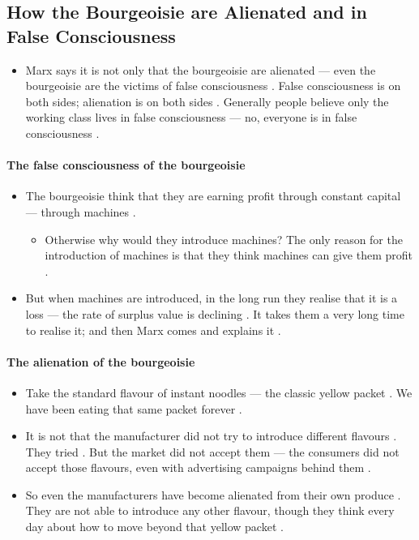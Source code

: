 \subsection{How the Bourgeoisie are Alienated and in False Consciousness}
\begin{itemize}
    \item Marx says it is not only that the bourgeoisie are alienated --- even the bourgeoisie are the victims of false consciousness . False consciousness is on both sides; alienation is on both sides . Generally people believe only the working class lives in false consciousness --- no, everyone is in false consciousness .
\end{itemize}

\paragraph{The false consciousness of the bourgeoisie}
\begin{itemize}
    \item The bourgeoisie think that they are earning profit through constant capital --- through machines .
    \begin{itemize}
        \item Otherwise why would they introduce machines? The only reason for the introduction of machines is that they think machines can give them profit .
    \end{itemize}
    \item But when machines are introduced, in the long run they realise that it is a loss --- the rate of surplus value is declining . It takes them a very long time to realise it; and then Marx comes and explains it .
\end{itemize}

\paragraph{The alienation of the bourgeoisie}
\begin{ExampleBox}
\begin{itemize}
    \item Take the standard flavour of instant noodles --- the classic yellow packet . We have been eating that same packet forever .
    \item It is not that the manufacturer did not try to introduce different flavours . They tried . But the market did not accept them --- the consumers did not accept those flavours, even with advertising campaigns behind them .
    \item So even the manufacturers have become alienated from their own produce . They are not able to introduce any other flavour, though they think every day about how to move beyond that yellow packet .
\end{itemize}
\end{ExampleBox}

